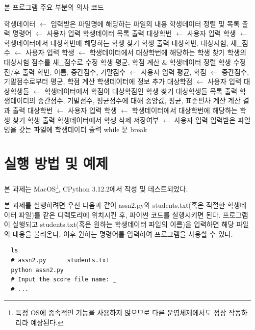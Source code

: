 \documentclass{article}
\begin{document}
\begin{algorithm}
  \caption{본 프로그램 주요 부분의 의사 코드} \label{alg:all}
  \begin{algorithmic}
    \State 학생데이터 $\gets$ 입력받은 파일명에 해당하는 파일의 내용
    \State 학생데이터 정렬 및 목록 출력
    \While {}
      \State 명령어 $\gets$ 사용자 입력
        \State 학생데이터 목록 출력
        \State 대상학번 $\gets$ 사용자 입력
        \State 학생 $\gets$ 학생데이터에서 대상학번에 해당하는 학생 찾기
        \State 학생 출력
        \State 대상학번, 대상시험, 새\_점수 $\gets$ 사용자 입력
        \State 학생 $\gets$ 학생데이터에서 대상학번에 해당하는 학생 찾기
        \State 학생의 대상시험 점수를 새\_점수로 수정
        \State 학생 평균, 학점 계산 \& 학생데이터 정렬
        \State 학생 수정 전/후 출력
        \State 학번, 이름, 중간점수, 기말점수 $\gets$ 사용자 입력
        \State 평균, 학점 $\gets$ 중간점수, 기말점수로부터 평균, 학점 계산
        \State 학생데이터에 정보 추가
        \State 대상학점 $\gets$ 사용자 입력
        \State 대상학생들 $\gets$ 학생데이터에서 학점이 대상학점인 학생 찾기
        \State 대상학생들 목록 출력
        \State 학생데이터의 중간점수, 기말점수, 평균점수에 대해 중앙값, 평균, 표준편차 계산
        \State 계산 결과 출력
        \State 대상학번 $\gets$ 사용자 입력
        \State 학생 $\gets$ 학생데이터에서 대상학번에 해당하는 학생 찾기
        \State 학생 출력
          \State 학생데이터에서 학생 삭제
        \EndIf
        \State 저장여부 $\gets$ 사용자 입력
          \State 입력받은 파일명을 갖는 파일에 학생데이터 출력
        \EndIf
        \State while 문 break
      \EndIf
    \EndWhile
  \end{algorithmic}
\end{algorithm}

\section{실행 방법 및 예제}

본 과제는 MacOS\footnote{특정 OS에 종속적인 기능을 사용하지 않으므로 다른 운영체제에서도 정상 작동하리라 예상된다.}, CPython 3.12.2에서 작성 및 테스트되었다.

본 과제를 실행하려면 우선 다음과 같이 assn2.py와 students.txt(혹은 적절한 학생데이터 파일)를 같은 디렉토리에 위치시킨 후,
파이썬 코드를 실행시키면 된다. 프로그램이 실행되고 students.txt(혹은 원하는 학생데이터 파일의 이름)을 입력하면 해당 파일의 내용을 불러온다. 이후 원하는 명령어를 입력하여 프로그램을 사용할 수 있다.
\begin{verbatim}
  ls
  # assn2.py      students.txt
  python assn2.py
  # Input the score file name: _
  # ...
\end{verbatim}
\end{document}
